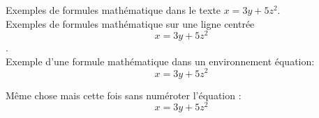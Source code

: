 \documentclass[10pt,a4paper]{article}
\begin{document}
Exemples de formules mathématique dans le texte $x=3y+5z^2$.\\
Exemples de formules mathématique sur une ligne centrée $$x=3y+5z^2$$.\\
Exemple d'une formule mathématique dans un environnement équation: 
\begin{equation}
x=3y+5z^2
\label{eq:ex1}
\end{equation}

Même chose mais cette fois sans numéroter l'équation : 
\begin{equation*}
x=3y+5z^2
\label{eq:ex1}
\end{equation*}
\end{document}
